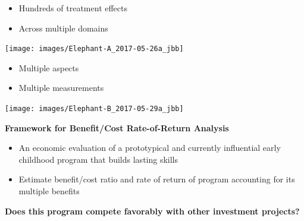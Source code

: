 \documentclass[static]{JJH-Beamer}
\begin{document}

\begin{itemize}
\item Hundreds of treatment effects
\item Across multiple domains
\end{itemize}

\begin{frame}

\begin{center}
\texttt{[image: images/Elephant-A\_2017-05-26a\_jbb]}\\
\end{center}

\end{frame}

\begin{itemize}
\item Multiple aspects
\item Multiple measurements
\end{itemize}

\clearpage

\begin{frame}

\begin{center}
\texttt{[image: images/Elephant-B\_2017-05-29a\_jbb]}\\
\end{center}

\end{frame}

\begin{frame}

\begin{center}
\textbf{Framework for Benefit/Cost Rate-of-Return Analysis}
\end{center}

\begin{itemize}
\item An economic evaluation of a prototypical and currently influential early childhood program that builds lasting skills
\item Estimate benefit/cost ratio and rate of return of program accounting for its multiple benefits
\end{itemize}

\begin{center}
\textbf{Does this program compete favorably with other investment projects?}
\end{center}

\end{frame}
\end{document}
